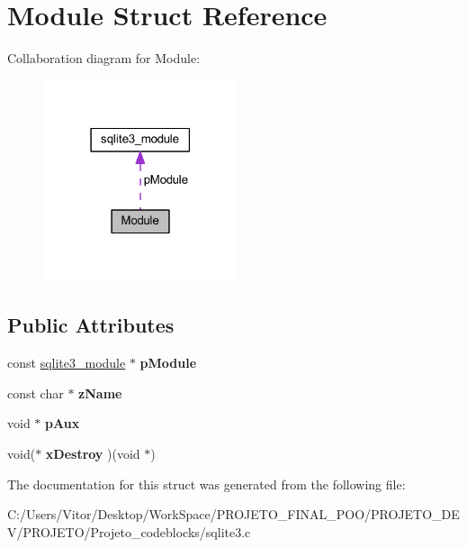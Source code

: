 \hypertarget{struct_module}{\section{Module Struct Reference}
\label{struct_module}
}


Collaboration diagram for Module\-:\nopagebreak
\begin{figure}[H]
\begin{center}
\leavevmode
\includegraphics[width=162pt]{struct_module__coll__graph}
\end{center}
\end{figure}
\subsection*{Public Attributes}
\begin{DoxyCompactItemize}
\item 
\hypertarget{struct_module_a65d2539d71ea028b505b2fb33563bfd7}{const \hyperlink{structsqlite3__module}{sqlite3\-\_\-module} $\ast$ {\bfseries p\-Module}}\label{struct_module_a65d2539d71ea028b505b2fb33563bfd7}

\item 
\hypertarget{struct_module_a45a5f5b43926b8ebf3e13e46a6534810}{const char $\ast$ {\bfseries z\-Name}}\label{struct_module_a45a5f5b43926b8ebf3e13e46a6534810}

\item 
\hypertarget{struct_module_ae3b827fee4c8b4f3ff38c86c2e2f48cd}{void $\ast$ {\bfseries p\-Aux}}\label{struct_module_ae3b827fee4c8b4f3ff38c86c2e2f48cd}

\item 
\hypertarget{struct_module_a4be509110a1a2f2c06a5d69af45704ca}{void($\ast$ {\bfseries x\-Destroy} )(void $\ast$)}\label{struct_module_a4be509110a1a2f2c06a5d69af45704ca}

\end{DoxyCompactItemize}


The documentation for this struct was generated from the following file\-:\begin{DoxyCompactItemize}
\item 
C\-:/\-Users/\-Vitor/\-Desktop/\-Work\-Space/\-P\-R\-O\-J\-E\-T\-O\-\_\-\-F\-I\-N\-A\-L\-\_\-\-P\-O\-O/\-P\-R\-O\-J\-E\-T\-O\-\_\-\-D\-E\-V/\-P\-R\-O\-J\-E\-T\-O/\-Projeto\-\_\-codeblocks/sqlite3.\-c\end{DoxyCompactItemize}
